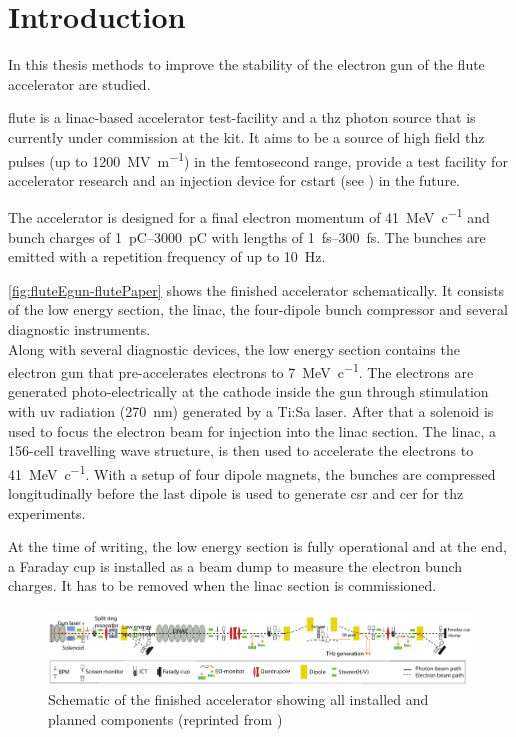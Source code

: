 \chapter{Introduction}\label{sec:intro}
In this thesis methods to improve the stability of the electron gun of the \gls{flute} accelerator are studied.

\Gls{flute} is a \gls{linac}-based accelerator test-facility and a \gls{thz} photon source that is currently under commission at the \gls{kit}. It aims to be a source of high field \gls{thz} pulses (up to \SI{1200}{\mega\volt\per\meter}) in the femtosecond range, provide a test facility for accelerator research and an injection device for \gls{cstart} (see \cite{SchaeferHaererPapash2019_1000091183}) in the future. \cite{Naknaimueang:2011zz}

The accelerator is designed for a final electron momentum of \SI{41}{\MeV\per c} and bunch charges of \SIrange{1}{3000}{\pico\coulomb} with lengths of \SIrange{1}{300}{\fs}. The bunches are emitted with a repetition frequency of up to \SI{10}{\hertz}. \cite{Malygin2018}

\autoref{fig:fluteEgun-flutePaper} shows the finished accelerator schematically. It consists of the low energy section, the \gls{linac}, the four-dipole bunch compressor and several diagnostic instruments.\\
Along with several diagnostic devices, the low energy section contains the electron gun that pre-accelerates electrons to \SI{7}{\MeV\per c}. The electrons are generated photo-electrically at the cathode inside the gun through stimulation with \gls{uv} radiation (\SI{270}{\nm}) generated by a Ti:Sa laser. After that a solenoid is used to focus the electron beam for injection into the \gls{linac} section. The \gls{linac}, a 156-cell travelling wave structure, is then used to accelerate the electrons to \SI{41}{\MeV\per c}. With a setup of four dipole magnets, the bunches are compressed longitudinally before the last dipole is used to generate \gls{csr} and \gls{cer} for \gls{thz} experiments. \cite{Nasse:IPAC13-WEPWA010}

At the time of writing, the low energy section is fully operational and at the end, a Faraday cup is installed as a beam dump to measure the electron bunch charges. It has to be removed when the \gls{linac} section is commissioned.

\begin{figure}[tb]
	\centering
	\includegraphics[width=\textwidth]{chap/StabilityOfTheElectronGun/img/flutePaper.png}
	\caption[FLUTE schematic with all components]{Schematic of the finished accelerator showing all installed and planned components (reprinted from \cite{Yan2018})}
	\label{fig:fluteEgun-flutePaper}
\end{figure}

